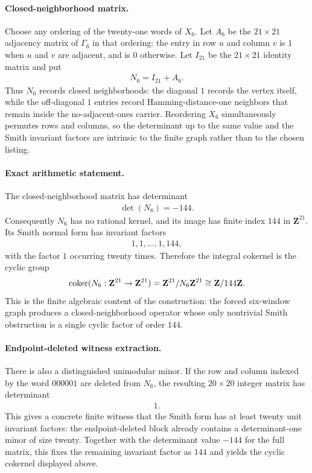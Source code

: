 \paragraph{Closed-neighborhood matrix.}
Choose any ordering of the twenty-one words of $X_6$. Let $A_6$ be the $21\times 21$ adjacency matrix of $\Gamma_6$ in that ordering: the entry in row $u$ and column $v$ is $1$ when $u$ and $v$ are adjacent, and is $0$ otherwise. Let $I_{21}$ be the $21\times 21$ identity matrix and put
$$
\begin{aligned}
N_6=I_{21}+A_6.
\end{aligned}
$$
Thus $N_6$ records closed neighborhoods: the diagonal $1$ records the vertex itself, while the off-diagonal $1$ entries record Hamming-distance-one neighbors that remain inside the no-adjacent-ones carrier. Reordering $X_6$ simultaneously permutes rows and columns, so the determinant up to the same value and the Smith invariant factors are intrinsic to the finite graph rather than to the chosen listing.

\paragraph{Exact arithmetic statement.}
The closed-neighborhood matrix has determinant
$$
\begin{aligned}
\det(N_6)=-144.
\end{aligned}
$$
Consequently $N_6$ has no rational kernel, and its image has finite index $144$ in $\mathbf{Z}^{21}$. Its Smith normal form has invariant factors
$$
\begin{aligned}
1,1,\ldots,1,144,
\end{aligned}
$$
with the factor $1$ occurring twenty times. Therefore the integral cokernel is the cyclic group
$$
\begin{aligned}
{\rm coker}(N_6:\mathbf{Z}^{21}\to \mathbf{Z}^{21})
  =\mathbf{Z}^{21}/N_6\mathbf{Z}^{21}\cong \mathbf{Z}/144\mathbf{Z}.
\end{aligned}
$$
This is the finite algebraic content of the construction: the forced six-window graph produces a closed-neighborhood operator whose only nontrivial Smith obstruction is a single cyclic factor of order $144$.

\paragraph{Endpoint-deleted witness extraction.}
There is also a distinguished unimodular minor. If the row and column indexed by the word $000001$ are deleted from $N_6$, the resulting $20\times 20$ integer matrix has determinant
$$
\begin{aligned}
1.
\end{aligned}
$$
This gives a concrete finite witness that the Smith form has at least twenty unit invariant factors: the endpoint-deleted block already contains a determinant-one minor of size twenty. Together with the determinant value $-144$ for the full matrix, this fixes the remaining invariant factor as $144$ and yields the cyclic cokernel displayed above.


